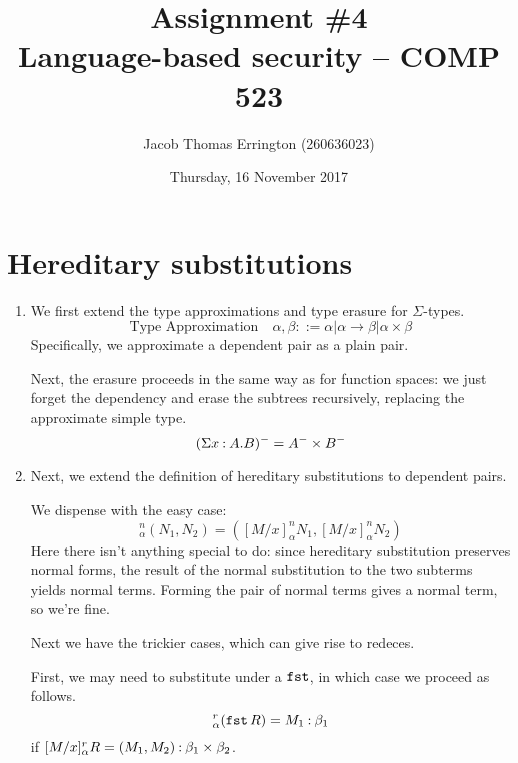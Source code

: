 \documentclass[11pt,letterpaper]{article}
\author{Jacob Thomas Errington (260636023)}
\title{Assignment \#4\\Language-based security -- COMP 523}
\date{Thursday, 16 November 2017}
\begin{document}
\maketitle

\section{Hereditary substitutions}

\begin{enumerate}
  \item
    We first extend the type approximations and type erasure for
    $\Sigma$-types.
    \begin{equation*}
      \text{Type Approximation}\quad
      \alpha,\beta
      ::= \alpha
      | \alpha \to \beta
      | \alpha \times \beta
    \end{equation*}
    Specifically, we approximate a dependent pair as a plain pair.

    Next, the erasure proceeds in the same way as for function spaces: we just
    forget the dependency and erase the subtrees recursively, replacing the
    approximate simple type.
    \begin{equation*}
      (\Sigma x \mathbin{:} A. B)^- = A^- \times B^-
    \end{equation*}

  \item
    Next, we extend the definition of hereditary substitutions to dependent
    pairs.

    We dispense with the easy case:
    \begin{equation*}
      [M/x]^n_\alpha (N_1, N_2) = ([M/x]^n_\alpha N_1, [M/x]^n_\alpha N_2)
    \end{equation*}
    Here there isn't anything special to do: since hereditary substitution
    preserves normal forms, the result of the normal substitution to the two
    subterms yields normal terms. Forming the pair of normal terms gives a
    normal term, so we're fine.

    Next we have the trickier cases, which can give rise to redeces.

    First, we may need to substitute under a $\operatorname{\mathtt{fst}}$, in which case we proceed
    as follows.
    \begin{equation*}
      [M/x]^r_\alpha (\fst R) = M_1 \hastype \beta_1
    \end{equation*}
    if $[M/x]^r_\alpha R = (M_1, M_2) \mathbin{:} \beta_1 \times \beta_2$.


\end{enumerate}
\end{document}
